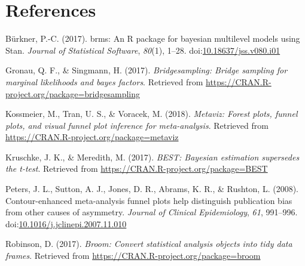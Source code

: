 \documentclass[floatsintext,doc]{apa6}
\begin{document}
\newpage

\hypertarget{references}{%
\section{References}\label{references}}

\setlength{\parindent}{-0.5in}
\setlength{\leftskip}{0.5in}
\setlength{\parskip}{8pt}

\noindent

\hypertarget{refs}{}
\leavevmode\hypertarget{ref-R-brms}{}%
Bürkner, P.-C. (2017). brms: An R package for bayesian multilevel models using Stan. \emph{Journal of Statistical Software}, \emph{80}(1), 1--28. doi:\href{https://doi.org/10.18637/jss.v080.i01}{10.18637/jss.v080.i01}

\leavevmode\hypertarget{ref-R-bridgesampling}{}%
Gronau, Q. F., \& Singmann, H. (2017). \emph{Bridgesampling: Bridge sampling for marginal likelihoods and bayes factors}. Retrieved from \url{https://CRAN.R-project.org/package=bridgesampling}

\leavevmode\hypertarget{ref-R-metaviz}{}%
Kossmeier, M., Tran, U. S., \& Voracek, M. (2018). \emph{Metaviz: Forest plots, funnel plots, and visual funnel plot inference for meta-analysis}. Retrieved from \url{https://CRAN.R-project.org/package=metaviz}

\leavevmode\hypertarget{ref-R-BEST}{}%
Kruschke, J. K., \& Meredith, M. (2017). \emph{BEST: Bayesian estimation supersedes the t-test}. Retrieved from \url{https://CRAN.R-project.org/package=BEST}

\leavevmode\hypertarget{ref-peters2008}{}%
Peters, J. L., Sutton, A. J., Jones, D. R., Abrams, K. R., \& Rushton, L. (2008). Contour-enhanced meta-analysis funnel plots help distinguish publication bias from other causes of asymmetry. \emph{Journal of Clinical Epidemiology}, \emph{61}, 991--996. doi:\href{https://doi.org/10.1016/j.jclinepi.2007.11.010}{10.1016/j.jclinepi.2007.11.010}

\leavevmode\hypertarget{ref-R-broom}{}%
Robinson, D. (2017). \emph{Broom: Convert statistical analysis objects into tidy data frames}. Retrieved from \url{https://CRAN.R-project.org/package=broom}
\end{document}
